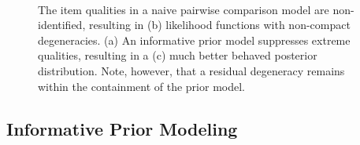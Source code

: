 \documentclass[
  letterpaper,
  DIV=11,
  numbers=noendperiod]{scrartcl}
\begin{document}
\begin{figure}
\begin{minipage}{0.33\linewidth}
{}

\subcaption{\label{fig-prior-containment2}}

\end{minipage}%
%
\begin{minipage}{0.33\linewidth}


\subcaption{\label{fig-prior-containment3}}

\end{minipage}%
%
\begin{minipage}{0.01\linewidth}
~\end{minipage}%

\caption{\label{fig-prior-containment}The item qualities in a naive
pairwise comparison model are non-identified, resulting in (b)
likelihood functions with non-compact degeneracies. (a) An informative
prior model suppresses extreme qualities, resulting in a (c) much better
behaved posterior distribution. Note, however, that a residual
degeneracy remains within the containment of the prior model.}

\end{figure}%

\subsection{Informative Prior
Modeling}\label{informative-prior-modeling}
\end{document}
